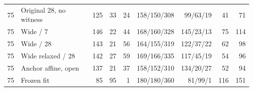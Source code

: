 \begin{tabular}{@{}rlrrrrrrr@{}}
75 & Original 28, no witness & 125 & 33 & 24 & 158/150/308 & 99/63/19 & 41 & 71 \\
75 & Wide / 7 & 146 & 22 & 44 & 168/160/328 & 145/23/13 & 75 & 114 \\
75 & Wide / 28 & 143 & 21 & 56 & 164/155/319 & 122/37/22 & 62 & 98 \\
75 & Wide relaxed / 28 & 142 & 27 & 59 & 169/166/335 & 117/45/19 & 54 & 96 \\
75 & Anchor affine, open & 137 & 21 & 37 & 158/152/310 & 134/20/27 & 52 & 94 \\
75 & Frozen fit & 85 & 95 & 1 & 180/180/360 & 81/99/1 & 116 & 151 \\
\bottomrule
\end{tabular}
